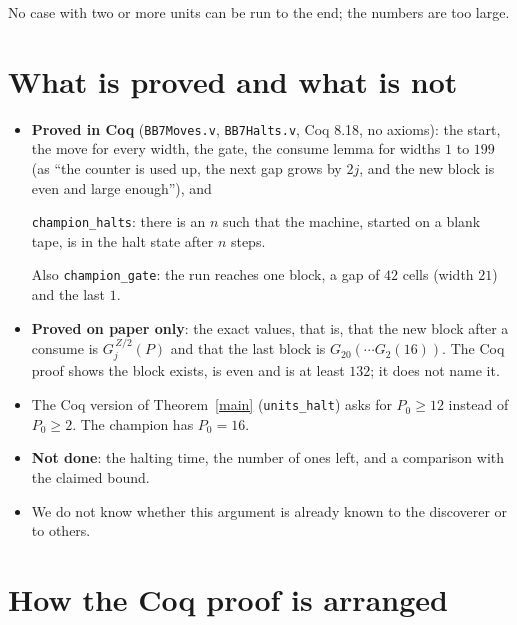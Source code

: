 \documentclass[11pt]{article}
\theoremstyle{definition}
\theoremstyle{remark}
\begin{document}
No case with two or more units can be run to the end; the numbers are too large.

\section{What is proved and what is not}

\begin{itemize}
\item \textbf{Proved in Coq} (\texttt{BB7Moves.v}, \texttt{BB7Halts.v}, Coq 8.18,
no axioms): the start, the move for every width, the gate, the consume lemma for
widths $1$ to $199$ (as ``the counter is used up, the next gap grows by $2j$, and
the new block is even and large enough''), and
\begin{center}
\texttt{champion\_halts}: there is an $n$ such that the machine, started on a
blank tape, is in the halt state after $n$ steps.
\end{center}
Also \texttt{champion\_gate}: the run reaches one block, a gap of $42$ cells
(width $21$) and the last $1$.
\item \textbf{Proved on paper only}: the exact values, that is, that the new
block after a consume is $G_j^{\,Z/2}(P)$ and that the last block is
$G_{20}(\cdots G_2(16))$. The Coq proof shows the block exists, is even and is
at least $132$; it does not name it.
\item The Coq version of Theorem~\ref{main} (\texttt{units\_halt}) asks for
$P_0\ge 12$ instead of $P_0\ge 2$. The champion has $P_0=16$.
\item \textbf{Not done}: the halting time, the number of ones left, and a
comparison with the claimed bound.
\item We do not know whether this argument is already known to the discoverer
or to others.
\end{itemize}

\section{How the Coq proof is arranged}
\end{document}

